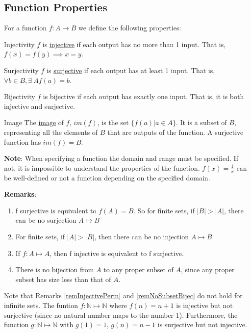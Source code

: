 \documentclass[../Main.tex]{subfiles}
\begin{document}
\subsection{Function Properties}
For a function $f : A \mapsto B$ we define the following properties:
\begin{definition}{Injectivity}
    $f$ is \underline{injective} if each output has no more than 1 input. That is, $f(x) = f(y) \implies x = y$.
\end{definition}
\begin{definition}{Surjectivity}
    $f$ is \underline{surjective} if each output has at least 1 input. That is, $\forall b \in B, \exists~A f(a) = b$.
\end{definition}
\begin{definition}{Bijectivity}
    $f$ is bijective if each output has exactly one input. That is, it is both injective and surjective.
\end{definition}
\begin{definition}{Image}
    The \underline{image} of $f$, $im(f)$, is the set $\{f(a) | a \in A\}$. It is a subset of $B$, representing all the elements of $B$ that are outputs of the function. A surjective function has $im(f) = B$.
\end{definition}
\textbf{Note}: When specifying a function the domain and range must be specified. If not, it is impossible to understand the properties of the function. $f(x) = \frac{1}{x}$ can be well-defined or not a function depending on the specified domain.\par
\textbf{Remarks}:
\begin{enumerate}
    \item f surjective is equivalent to $f(A) = B$. So for finite sets, if $|B|>|A|$, there can be no surjection $A \mapsto B$
    \item For finite sets, if $|A|>|B|$, then there can be no injection $A \mapsto B$
    \item If $f:A \mapsto A$, then f injective is equivalent to f surjective.\label{remInjectivePerm}
    \item There is no bijection from $A$ to any proper subset of $A$, since any proper subset has size less than that of $A$.\label{remNoSubsetBijec}
\end{enumerate}
Note that Remarks \ref{remInjectivePerm} and \ref{remNoSubsetBijec} do not hold for infinite sets. The funtion $f : \mathbb{N} \mapsto \mathbb{N}$ where $f(n) = n + 1$ is injective but not surjective (since no natural number maps to the number $1$). Furthermore, the function $g : \mathbb{N} \mapsto \mathbb{N}$ with $g(1) = 1$, $g(n) = n-1$ is surjective but not injective.\par
\end{document}
